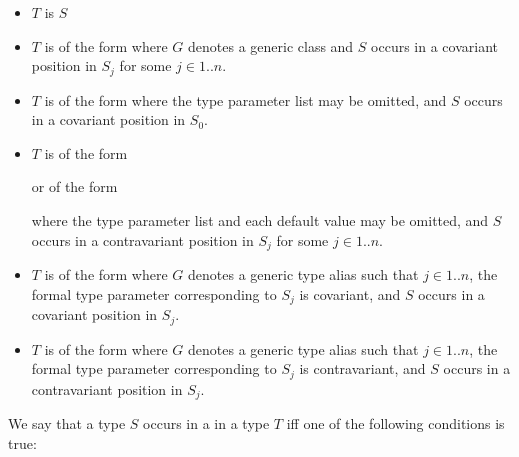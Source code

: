 \documentclass[makeidx]{article}
\begin{document}
\begin{itemize}
\item $T$ is $S$

\item $T$ is of the form 
  where $G$ denotes a generic class
  and $S$ occurs in a covariant position in $S_j$ for some $j \in 1 .. n$.

\item $T$ is of the form
  where the type parameter list may be omitted,
  and $S$ occurs in a covariant position in $S_0$.

\item $T$ is of the form



  \noindent
  or of the form



  \noindent
  where the type parameter list and each default value may be omitted,
  and $S$ occurs in a contravariant position in $S_j$
  for some $j \in 1 .. n$.

\item $T$ is of the form 
  where $G$ denotes a generic type alias such that
  $j \in 1 .. n$,
  the formal type parameter corresponding to $S_j$ is covariant,
  and $S$ occurs in a covariant position in $S_j$.

\item $T$ is of the form 
  where $G$ denotes a generic type alias such that
  $j \in 1 .. n$,
  the formal type parameter corresponding to $S_j$ is contravariant,
  and $S$ occurs in a contravariant position in $S_j$.
\end{itemize}

\LMHash{}%
We say that a type $S$ occurs in a  in a type $T$
if{}f one of the following conditions is true:
\end{document}
